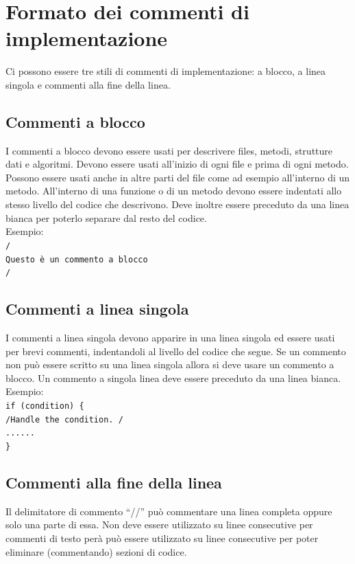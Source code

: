 \documentclass[11pt,titlepage,a4paper]{report}
\begin{document}
\section{Formato dei commenti di implementazione}
Ci possono essere tre stili di commenti di implementazione: a blocco, a linea singola e commenti alla fine della linea.
\subsection{Commenti a blocco}
I commenti a blocco devono essere usati per descrivere files, metodi, strutture dati e algoritmi. Devono essere usati all'inizio di ogni file e prima
di ogni metodo. Possono essere usati anche in altre parti del file come ad esempio all'interno di un metodo. All'interno di una funzione o di un metodo devono essere indentati allo stesso livello del codice che descrivono. Deve inoltre essere preceduto da una linea bianca per poterlo separare dal resto del codice. \\
 \newline
Esempio: \\
\texttt{/\ast \\
\ast Questo è un commento a blocco \\
\ast/ } \\
 \newline
\subsection{Commenti a linea singola}
I commenti a linea singola devono apparire in una linea singola ed essere usati per brevi commenti, indentandoli al livello del codice che segue. Se un commento non può essere scritto su una linea singola allora si deve usare un commento a blocco. Un commento a singola linea deve essere preceduto da una linea bianca. \\
 \newline
Esempio: \\
\texttt{if (condition) \{ \\
        /\ast Handle the condition. \ast/ \\
        ...... \\
\}} \\
 \newline
\subsection{Commenti alla fine della linea}
Il delimitatore di commento ``//'' può commentare una linea completa oppure solo una parte di essa. Non deve essere utilizzato su linee consecutive per commenti di testo per\`a può essere utilizzato su linee consecutive per poter eliminare (commentando) sezioni di codice.
\end{document}
